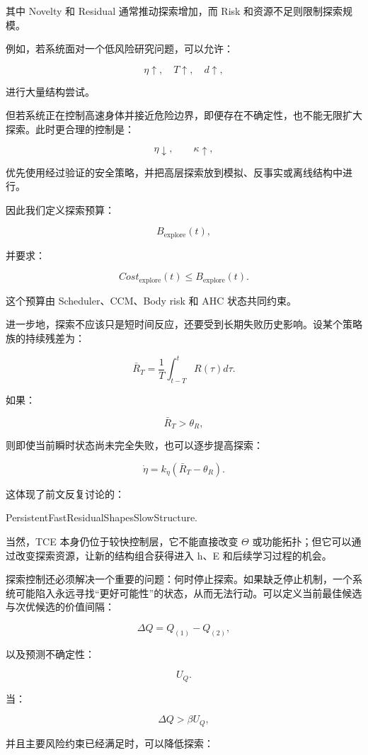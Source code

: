 其中 Novelty 和 Residual 通常推动探索增加，而 Risk 和资源不足则限制探索规模。

例如，若系统面对一个低风险研究问题，可以允许：

\[
\eta\uparrow,
\quad
T\uparrow,
\quad
d\uparrow,
\]

进行大量结构尝试。

但若系统正在控制高速身体并接近危险边界，即便存在不确定性，也不能无限扩大探索。此时更合理的控制是：

\[
\eta\downarrow,
\qquad
\kappa\uparrow,
\]

优先使用经过验证的安全策略，并把高层探索放到模拟、反事实或离线结构中进行。

因此我们定义探索预算：

\[
B_{\mathrm{explore}}(t),
\]

并要求：

\[
Cost_{\mathrm{explore}}(t)
\le
B_{\mathrm{explore}}(t).
\]

这个预算由 Scheduler、CCM、Body risk 和 AHC 状态共同约束。

进一步地，探索不应该只是短时间反应，还要受到长期失败历史影响。设某个策略族的持续残差为：

\[
\bar R_T
=
\frac{1}{T}
\int_{t-T}^{t}R(\tau)d\tau.
\]

如果：

\[
\bar R_T>\theta_R,
\]

则即使当前瞬时状态尚未完全失败，也可以逐步提高探索：

\[
\dot\eta
=
k_\eta
(\bar R_T-\theta_R).
\]

这体现了前文反复讨论的：

\begin{statementbox}
PersistentFastResidualShapesSlowStructure.
\end{statementbox}

当然，TCE 本身仍位于较快控制层，它不能直接改变 $\Theta$ 或功能拓扑；但它可以通过改变探索资源，让新的结构组合获得进入 h、E 和后续学习过程的机会。

探索控制还必须解决一个重要的问题：何时停止探索。如果缺乏停止机制，一个系统可能陷入永远寻找“更好可能性”的状态，从而无法行动。可以定义当前最佳候选与次优候选的价值间隔：

\[
\Delta Q
=
Q_{(1)}-Q_{(2)},
\]

以及预测不确定性：

\[
U_Q.
\]

当：

\[
\Delta Q
>
\beta U_Q,
\]

并且主要风险约束已经满足时，可以降低探索：

